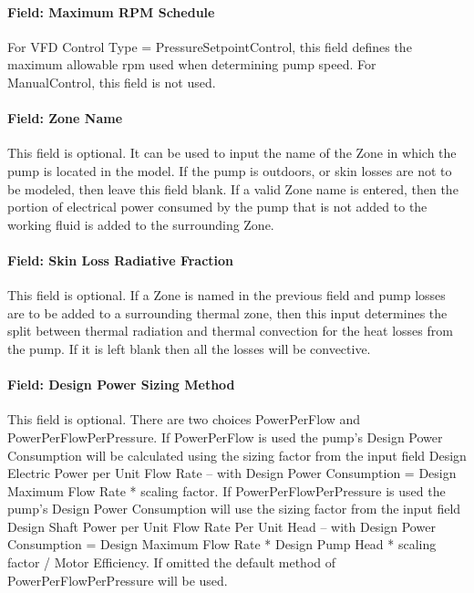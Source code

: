 \paragraph{Field: Maximum RPM Schedule}\label{field-maximum-rpm-schedule}

For VFD Control Type = PressureSetpointControl, this field defines the maximum allowable rpm used when determining pump speed. For ManualControl, this field is not used.

\paragraph{Field: Zone Name}\label{field-zone-name-008}

This field is optional. It can be used to input the name of the Zone in which the pump is located in the model. If the pump is outdoors, or skin losses are not to be modeled, then leave this field blank. If a valid Zone name is entered, then the portion of electrical power consumed by the pump that is not added to the working fluid is added to the surrounding Zone.

\paragraph{Field: Skin Loss Radiative Fraction}\label{field-skin-loss-radiative-fraction-000}

This field is optional. If a Zone is named in the previous field and pump losses are to be added to a surrounding thermal zone, then this input determines the split between thermal radiation and thermal convection for the heat losses from the pump. If it is left blank then all the losses will be convective.

\paragraph{Field: Design Power Sizing Method}\label{field-design-power-sizing-method}

This field is optional. There are two choices PowerPerFlow and PowerPerFlowPerPressure. If PowerPerFlow is used the pump's Design Power Consumption will be calculated using the sizing factor from the input field Design Electric Power per Unit Flow Rate -- with Design Power Consumption = Design Maximum Flow Rate * scaling factor. If PowerPerFlowPerPressure is used the pump's Design Power Consumption will use the sizing factor from the input field Design Shaft Power per Unit Flow Rate Per Unit Head -- with Design Power Consumption = Design Maximum Flow Rate * Design Pump Head * scaling factor / Motor Efficiency. If omitted the default method of PowerPerFlowPerPressure will be used.

